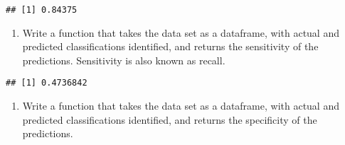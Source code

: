 \documentclass[]{article}
\newenvironment{Shaded}{\begin{snugshade}}{\end{snugshade}}
\newcommand{\KeywordTok}[1]{\textcolor[rgb]{0.13,0.29,0.53}{\textbf{#1}}}
\newcommand{\DecValTok}[1]{\textcolor[rgb]{0.00,0.00,0.81}{#1}}
\newcommand{\StringTok}[1]{\textcolor[rgb]{0.31,0.60,0.02}{#1}}
\newcommand{\ControlFlowTok}[1]{\textcolor[rgb]{0.13,0.29,0.53}{\textbf{#1}}}
\newcommand{\OperatorTok}[1]{\textcolor[rgb]{0.81,0.36,0.00}{\textbf{#1}}}
\newcommand{\NormalTok}[1]{#1}
\providecommand{\tightlist}{%
  \setlength{\itemsep}{0pt}\setlength{\parskip}{0pt}}
\begin{document}
\begin{verbatim}
## [1] 0.84375
\end{verbatim}

\begin{enumerate}
\def\labelenumi{\arabic{enumi}.}
\setcounter{enumi}{5}
\tightlist
\item
  Write a function that takes the data set as a dataframe, with actual
  and predicted classifications identified, and returns the sensitivity
  of the predictions. Sensitivity is also known as recall.
\end{enumerate}

\begin{Shaded}
\end{Shaded}

\begin{verbatim}
## [1] 0.4736842
\end{verbatim}

\begin{enumerate}
\def\labelenumi{\arabic{enumi}.}
\setcounter{enumi}{6}
\tightlist
\item
  Write a function that takes the data set as a dataframe, with actual
  and predicted classifications identified, and returns the specificity
  of the predictions.
\end{enumerate}

\begin{Shaded}
\end{Shaded}
\end{document}
